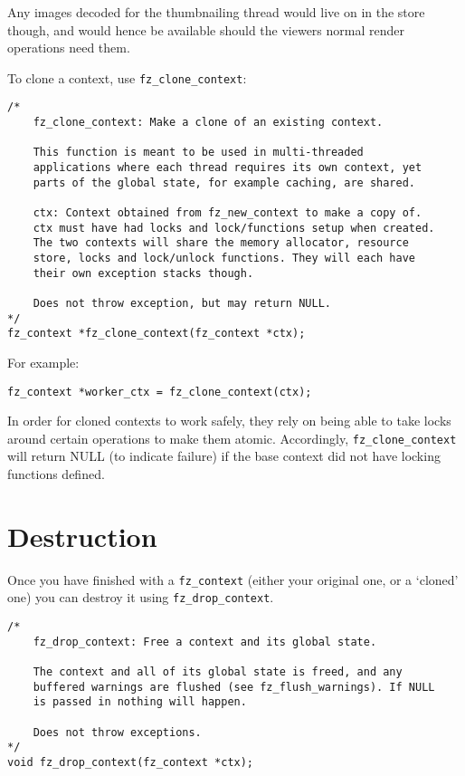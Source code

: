 \documentclass[oneside]{book}
\begin{document}
Any images decoded for the thumbnailing thread would live on in the store though, and would hence be available should the viewers normal render operations need them.

To clone a context, use \texttt{fz\_clone\_context}:

\begin{lstlisting}
/*
	fz_clone_context: Make a clone of an existing context.

	This function is meant to be used in multi-threaded
	applications where each thread requires its own context, yet
	parts of the global state, for example caching, are shared.

	ctx: Context obtained from fz_new_context to make a copy of.
	ctx must have had locks and lock/functions setup when created.
	The two contexts will share the memory allocator, resource
	store, locks and lock/unlock functions. They will each have
	their own exception stacks though.

	Does not throw exception, but may return NULL.
*/
fz_context *fz_clone_context(fz_context *ctx);
\end{lstlisting}

For example:

\begin{lstlisting}
fz_context *worker_ctx = fz_clone_context(ctx);
\end{lstlisting}

In order for cloned contexts to work safely, they rely on being able to take locks around certain operations to make them atomic. Accordingly, \texttt{fz\_clone\_context} will return NULL (to indicate failure) if the base context did not have locking functions defined.


\section{Destruction}

Once you have finished with a \texttt{fz\_context} (either your original one, or a `cloned' one) you can destroy it using \texttt{fz\_drop\_context}.

\begin{lstlisting}
/*
	fz_drop_context: Free a context and its global state.

	The context and all of its global state is freed, and any
	buffered warnings are flushed (see fz_flush_warnings). If NULL
	is passed in nothing will happen.

	Does not throw exceptions.
*/
void fz_drop_context(fz_context *ctx);
\end{lstlisting}
\end{document}
